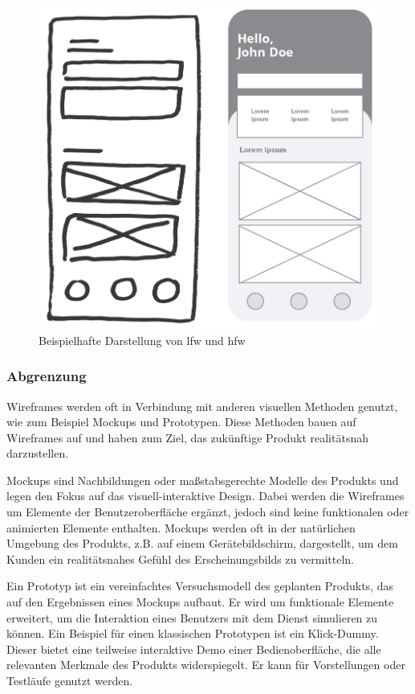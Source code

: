 \begin{figure}[!htb]
    \centering
    \includegraphics[scale=1]{figures/jan/Wire_Fixes-LFWvsHFW2.png}
    \caption[Beispielhafte Darstellung von \acrshort{lfw} und \acrshort{hfw}]{Beispielhafte Darstellung von \acrshort{lfw}  und \acrshort{hfw} \cite{TypeOfWireframes}}
    \label{fig:image}
\end{figure}

\subsubsection{Abgrenzung}
\label{sec:Abgrenzung}

Wireframes werden oft in Verbindung mit anderen visuellen Methoden genutzt, wie zum Beispiel Mockups und Prototypen. Diese Methoden bauen auf Wireframes auf und haben zum Ziel, das zukünftige Produkt realitätsnah darzustellen.

Mockups sind Nachbildungen oder maßstabsgerechte Modelle des Produkts und legen den Fokus auf das visuell-interaktive Design. Dabei werden die Wireframes um Elemente der Benutzeroberfläche ergänzt, jedoch sind keine funktionalen oder animierten Elemente enthalten. Mockups werden oft in der natürlichen Umgebung des Produkts, z.B. auf einem Gerätebildschirm, dargestellt, um dem Kunden ein realitätsnahes Gefühl des Erscheinungsbilds zu vermitteln.

Ein Prototyp ist ein vereinfachtes Versuchsmodell des geplanten Produkts, das auf den Ergebnissen eines Mockups aufbaut. Er wird um funktionale Elemente erweitert, um die Interaktion eines Benutzers mit dem Dienst simulieren zu können.
Ein Beispiel für einen klassischen Prototypen ist ein Klick-Dummy. Dieser bietet eine teilweise interaktive Demo einer Bedienoberfläche, die alle relevanten Merkmale des Produkts widerspiegelt. Er kann für Vorstellungen oder Testläufe genutzt werden.


